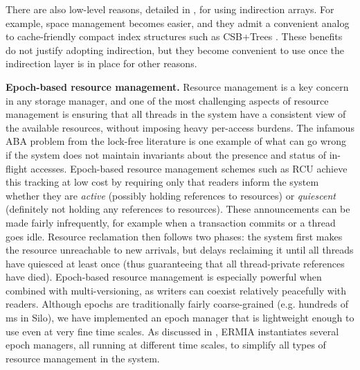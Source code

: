 There are also low-level reasons, detailed in , for using indirection arrays. For example, space management becomes easier, and they admit a convenient analog to cache-friendly compact index structures such as CSB+Trees \cite{RaoR00}. These benefits do not justify adopting indirection, but they become convenient to use once the indirection layer is in place for other reasons.

\vspace{2mm}
{\bf Epoch-based resource management.}
Resource management is a key concern in any storage manager, and one of the most challenging aspects of resource management is ensuring that all threads in the system have a consistent view of the available resources, without imposing heavy per-access burdens. The infamous ABA problem from the lock-free literature is one example of what can go wrong if the system does not maintain invariants about the presence and status of in-flight accesses. Epoch-based resource management schemes such as RCU \cite{McKenneyS98} achieve this tracking at low cost by requiring only that readers inform the system whether they are {\em active} (possibly holding references to resources) or {\em quiescent} (definitely not holding any references to resources). These announcements can be made fairly infrequently, for example when a transaction commits or a thread goes idle. Resource reclamation then follows two phases: the system first makes the resource unreachable to new arrivals, but delays reclaiming it until all threads have quiesced at least once (thus guaranteeing that all thread-private references have died). Epoch-based resource management is especially powerful when combined with multi-versioning, as writers can coexist relatively peacefully with readers. Although epochs are traditionally fairly coarse-grained (e.g. hundreds of ms in Silo), we have implemented an epoch manager that is lightweight enough to use even at very fine time scales. As discussed in , ERMIA instantiates several epoch managers, all running at different time scales, to simplify all types of resource management in the system. 

